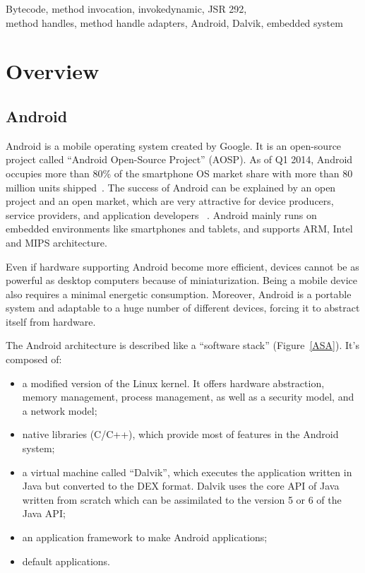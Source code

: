 \documentclass{sig-alternate}
\def \DALVIK{Dalvik\xspace}
\def \ANDROID{Android\xspace}
\def \DEX{DEX\xspace}
\begin{document}


\keywords
Bytecode, method invocation, invokedynamic, JSR 292,\\
method handles, method handle adapters, \ANDROID, Dalvik, embedded system

\newpage
\section{Overview}

  \subsection{\ANDROID}

    \ANDROID is a mobile operating system created by Google.
    It is an open-source project called ``\ANDROID Open-Source Project'' (AOSP).
    As of Q1 2014, \ANDROID occupies more than 80\% of the smartphone OS market share with more than 80 million units shipped~\cite{idc-website}.
    The success of \ANDROID can be explained by an open project and an open market,
    which are very attractive for device producers, service providers, and application developers
   ~\cite{ieee-butler-android-landscape}\cite{ieee-paulson-shift-dynamic-languages}.
    \ANDROID mainly runs on embedded environments like smartphones and tablets,
    and supports ARM, Intel and MIPS architecture.
    
    Even if hardware supporting \ANDROID become more efficient,
    devices cannot be as powerful as desktop computers because of miniaturization.
    Being a mobile device also requires a minimal energetic consumption.
    Moreover, \ANDROID is a portable system and adaptable to a huge number of different devices,
    forcing it to abstract itself from hardware.

    The \ANDROID architecture is described like a ``software stack'' (Figure~\ref{ASA}).
    It's composed of:
    \begin{itemize}
      \item a modified version of the Linux kernel.
        It offers hardware abstraction, memory management, process management, as well as a security model, and a network model;
      \item native libraries (C/C++),
        which provide most of features in the \ANDROID system;
      \item a virtual machine called ``\DALVIK'',
        which executes the application written in Java but converted to the \DEX format.
        \DALVIK uses the core API of Java written from scratch
        which can be assimilated to the version 5 or 6 of the Java API;
      \item an application framework to make \ANDROID applications;
      \item default applications.
    \end{itemize}
\end{document}
